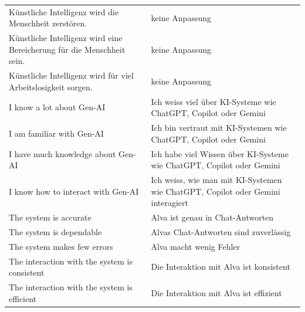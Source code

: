 \begin{center}
\begin{threeparttable}
\begin{tabularx}{\textwidth}{X X}
Künstliche Intelligenz wird die Menschheit zerstören. & keine Anpassung \\
Künstliche Intelligenz wird eine Bereicherung für die Menschheit sein. & keine Anpassung \\
Künstliche Intelligenz wird für viel Arbeitslosigkeit sorgen. & keine Anpassung \\
I know a lot about Gen-AI & Ich weiss viel über KI-Systeme wie ChatGPT, Copilot oder Gemini \\
I am familiar with Gen-AI & Ich bin vertraut mit KI-Systemen wie ChatGPT, Copilot oder Gemini \\
I have much knowledge about Gen-AI & Ich habe viel Wissen über KI-Systeme wie ChatGPT, Copilot oder Gemini \\
I know how to interact with Gen-AI & Ich weiss, wie man mit KI-Systemen wie ChatGPT, Copilot oder Gemini interagiert \\
The system is accurate & Alva ist genau in Chat-Antworten \\
The system is dependable & Alvas Chat-Antworten sind zuverlässig \\
The system makes few errors & Alva macht wenig Fehler \\
The interaction with the system is consistent & Die Interaktion mit Alva ist konsistent \\
The interaction with the system is efficient & Die Interaktion mit Alva ist effizient \\
\bottomrule
\end{tabularx}
\end{threeparttable}
\end{center}
\vspace{1em}